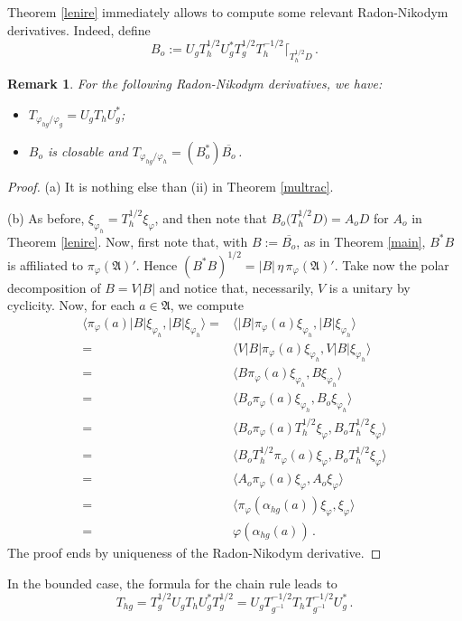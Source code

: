 \documentclass[12pt]{amsart}
\numberwithin{equation}{section}
\def\ga{{\mathfrak A}} \def\gpa{{\mathfrak a}}
\def\a{\alpha}
\def\f{\varphi}\def\ff{\phi} \def\F{\Phi}
\newtheorem{rem}[thm]{Remark}
\begin{document}
\bigskip


Theorem \ref{lenire} immediately allows to compute some relevant Radon-Nikodym derivatives. Indeed,
define
$$
B_o:=U_g T_h^{1/2}U_g^*T_g^{1/2}T_h^{-1/2}\lceil_{T_h^{1/2}D}\,.
$$
\begin{rem}
For the following Radon-Nikodym derivatives, we have:
\begin{itemize}
\item[(a)] $T_{\f_{hg}/\f_{g}}=U_gT_hU_g^*$;
\item[(b)] $B_o$ is closable and $T_{\f_{hg}/\f_{h}}=(B_o^*)\overline{B_o}$\,.
\end{itemize}
\end{rem}
\begin{proof}
(a) It is nothing else than (ii) in Theorem \ref{multrac}.

(b) As before, $\xi_{\f_h}=T_h^{1/2}\xi_\f$, and then note that $B_o\big(T_h^{1/2}D\big)=A_o D$ for $A_o$ in Theorem \ref{lenire}. 
Now, first note that, with $B:=\overline{B_o}$, as in Theorem \ref{main}, $B^*B$ is affiliated to $\pi_\f(\ga)'$. Hence 
$(B^*B)^{1/2}=|B|\,\eta\,\pi_\f(\ga)'$. Take now the polar decomposition of $B=V|B|$ and notice that, necessarily, $V$ is a unitary by cyclicity. Now, for each $a\in\ga$, we compute
\begin{align*}
\langle\pi_\f(a)|B|\xi_{\f_h},|B|\xi_{\f_h}\rangle=&\langle|B|\pi_\f(a)\xi_{\f_h},|B|\xi_{\f_h}\rangle\\
=&\langle V|B|\pi_\f(a)\xi_{\f_h},V|B|\xi_{\f_h}\rangle\\
=&\langle B\pi_\f(a)\xi_{\f_h},B\xi_{\f_h}\rangle\\
=&\langle B_o\pi_\f(a)\xi_{\f_h},B_o\xi_{\f_h}\rangle\\
=&\langle B_o\pi_\f(a)T_h^{1/2}\xi_{\f},B_oT_h^{1/2}\xi_{\f}\rangle\\
=&\langle B_oT_h^{1/2}\pi_\f(a)\xi_{\f},B_oT_h^{1/2}\xi_{\f}\rangle\\
=&\langle A_o\pi_\f(a)\xi_{\f},A_o\xi_{\f}\rangle\\
=&\langle \pi_\f(\a_{hg}(a))\xi_\f,\xi_\f\rangle\\
=&\f(\a_{hg}(a))\,.
\end{align*}
The proof ends by uniqueness of the Radon-Nikodym derivative.
\end{proof}

In the bounded case, the formula for the chain rule leads to
\begin{equation*}
T_{hg}=T_g^{1/2}U_g T_h U_g^{*}T_g^{1/2}=U_gT_{g^{-1}}^{-1/2}T_h T_{g^{-1}}^{-1/2}U_g^{*}\,.
\end{equation*}
\end{document}
